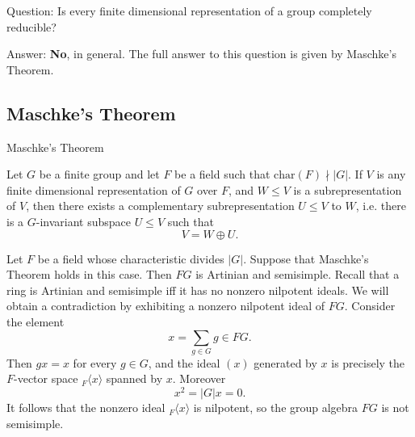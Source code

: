 \begin{frame}
\begin{block}{Question:}
Is every finite dimensional representation of a group completely reducible? 
\end{block}
\begin{block}{Answer:}
\textbf{No}, in general.  The full answer to this question is given by Maschke's Theorem.
\end{block}
\end{frame}

\subsection{Maschke's Theorem}
\begin{frame}{Maschke's Theorem}
\begin{theorem}
Let $G$ be a finite group and let $F$ be a field such that $\text{char}(F) \nmid |G|$.  If $V$ is any finite dimensional representation of $G$ over $F$, and $W \leq V$ is a subrepresentation of $V$, then there exists a complementary subrepresentation $U \leq V$ to $W$, i.e. there is  a $G$-invariant subspace $U \leq V$ such that 
\[ V = W \oplus U. \]
\end{theorem}
\end{frame}

\begin{frame}
\begin{example}
Let $F$ be a field whose characteristic divides $|G|$. Suppose that Maschke's Theorem holds in this case.  Then $FG$ is Artinian and semisimple.  Recall that a ring is Artinian and semisimple iff it has no nonzero nilpotent ideals.  We will obtain a contradiction by exhibiting a nonzero nilpotent ideal of $FG$. Consider the element \[x =  \sum_{g \in G} g \in FG.  \] Then $g x =x$ for every $g \in G$, and the ideal $(x)$ generated by $x$ is precisely the $F$-vector space $_{F} \langle x \rangle$ spanned by $x$.  Moreover \[x^2 = |G| x = 0. \]  It follows that the nonzero ideal $_{F} \langle x \rangle$ is nilpotent, so the group algebra $FG$ is not semisimple. 
\end{example}
\end{frame}

